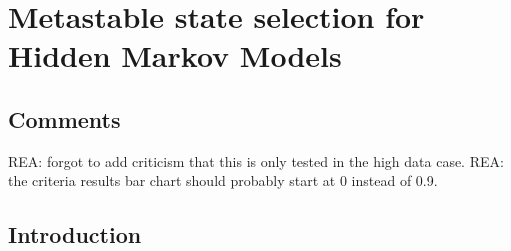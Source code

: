 \let\textcircled=\pgftextcircled
\chapter{Metastable state selection for Hidden Markov Models}
\label{chap:hmm}

\section{Comments}
REA: forgot to add criticism that this is only tested in the high data case. 
REA: the criteria results bar chart should probably start at 0 instead of 0.9. 


\section{Introduction}
